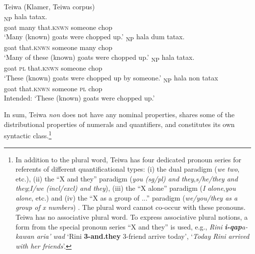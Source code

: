 \ea%
\label{ex:30}
Teiwa (Klamer, Teiwa corpus)\\
\ea
{}\textsubscript{NP} hala tatax. \\
   goat many that.\textsc{knwn} someone chop  \\
 \glt `Many (known) goats were chopped up.'
\ex
{}\textsubscript{NP} hala dum tatax. \\
   goat that.\textsc{knwn} someone many chop  \\
\glt `Many of these (known) goats were chopped up.'
\ex
{}\textsubscript{NP} hala tatax. \\
   goat \textsc{pl} that.\textsc{knwn} someone chop  \\
\glt  `These (known) goats were chopped up by someone.'
\ex
{}\textsubscript{NP} hala non tatax \\
   goat that.\textsc{knwn} someone \textsc{pl} chop  \\
\glt  Intended: `These (known) goats were chopped up.'
\z
\z


In sum, Teiwa \textit{non} does not have any nominal properties, shares some of the distributional properties of numerals and quantifiers, and constitutes its own syntactic class.\footnote{  In addition to the plural word, Teiwa has four dedicated pronoun series for referents of different quantificational types: (i) the dual paradigm (\textit{we} \textit{two}, etc.), (ii) the ``X and they'' paradigm (\textit{you (sg/pl) and they},\textit{s/he/they and they};\textit{I/we (incl/excl) and they}), (iii) the ``X alone'' paradigm (\textit{I} \textit{alone},\textit{you} \textit{alone}, etc.) and (iv) the ``X as a group of ...'' paradigm (\textit{we/you/they as a group of x numbers}) \citep[82-85]{Klamer2010}. The plural word cannot co-occur with these pronouns. Teiwa has no associative plural word. To express associative plural notions, a form from the special pronoun series ``X and they'' is used, e.g., \textit{Rini } \textbf{\textit{i-qap}}\textit{a-kawan aria' wad } `Rini \textbf{3-and.they} 3-friend
arrive today',  `\textit{Today} \textit{Rini arrived with her friends}'.}

